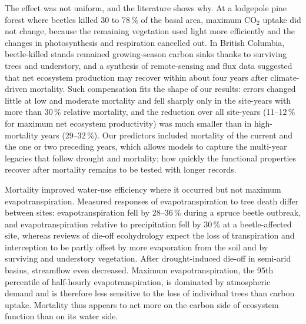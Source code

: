 \documentclass[11pt,a4paper]{article}
\begin{document}
The effect was not uniform, and the literature shows why. At a lodgepole pine forest where beetles killed 30 to 78\,\%
of the basal area, maximum CO$_2$ uptake did not change, because the remaining vegetation used light more efficiently
and the changes in photosynthesis and respiration cancelled out\cite{reed2014impact}. In British Columbia, beetle-killed
stands remained growing-season carbon sinks thanks to surviving trees and understory\cite{brown2009impact}, and a
synthesis of remote-sensing and flux data suggested that net ecosystem production may recover within about four years
after climate-driven mortality\cite{anderegg2016when}. Such compensation fits the shape of our results: errors changed
little at low and moderate mortality and fell sharply only in the site-years with more than 30\,\% relative mortality, and
the reduction over all site-years (11--12\,\% for maximum net ecosystem productivity) was much smaller than in
high-mortality years (29--32\,\%). Our predictors included mortality of the current and the one or two preceding years,
which allows models to capture the multi-year legacies that follow drought and mortality\cite{anderegg2015pervasive};
how quickly the functional properties recover after mortality remains to be tested with longer records.

Mortality improved water-use efficiency where it occurred but not maximum evapotranspiration. Measured responses of
evapotranspiration to tree death differ between sites: evapotranspiration fell by 28--36\,\% during a spruce beetle
outbreak\cite{frank2014ecosystem}, and evapotranspiration relative to precipitation fell by 30\,\% at a beetle-affected
site\cite{knowles2023bark}, whereas reviews of die-off ecohydrology expect the loss of transpiration and interception to
be partly offset by more evaporation from the soil and by surviving and understory vegetation\cite{adams2011ecohydrological}.
After drought-induced die-off in semi-arid basins, streamflow even decreased\cite{guardiolaclaramonte2011decreased}.
Maximum evapotranspiration, the 95th percentile of half-hourly evapotranspiration, is dominated by atmospheric demand
and is therefore less sensitive to the loss of individual trees than carbon uptake. Mortality thus appears to act more
on the carbon side of ecosystem function than on its water side.
\end{document}
